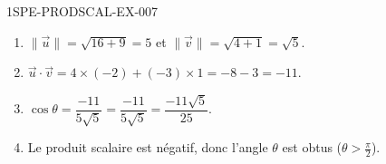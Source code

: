 \begin{corrige}{1SPE-PRODSCAL-EX-007}
\begin{enumerate}
\item $\|\vec{u}\| = \sqrt{16 + 9} = 5$ et $\|\vec{v}\| = \sqrt{4 + 1} = \sqrt{5}$.
\item $\vec{u} \cdot \vec{v} = 4 \times (-2) + (-3) \times 1 = -8 - 3 = -11$.
\item $\cos\theta = \dfrac{-11}{5\sqrt{5}} = \dfrac{-11}{5\sqrt{5}} = \dfrac{-11\sqrt{5}}{25}$.
\item Le produit scalaire est négatif, donc l'angle $\theta$ est obtus ($\theta > \frac{\pi}{2}$).
\end{enumerate}
\end{corrige}
